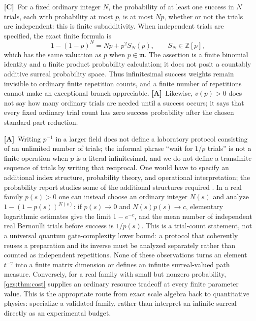 \documentclass[11pt,oneside]{article}
\numberwithin{equation}{section}
\theoremstyle{plain}
\theoremstyle{definition}
\theoremstyle{remark}
\newcommand{\Z}{\mathbb Z}
\newcommand{\mm}{\mathfrak m}
\newcommand{\TC}{\textcolor{TierC}{\textsf{\bfseries[C]}}}
\newcommand{\TA}{\textcolor{TierA}{\textsf{\bfseries[A]}}}
\begin{document}
\TC\ For a fixed ordinary integer $N$, the probability of at least one success in $N$ trials, each with probability at most $p$, is at most $Np$, whether or not the trials are independent: this is finite subadditivity. When independent trials are specified, the exact finite formula is
\[
 1-(1-p)^N=Np+p^2S_N(p),\qquad S_N\in\Z[p],
\]
which has the same valuation as $p$ when $p\in\mm$. The assertion is a finite binomial identity and a finite product probability calculation; it does not posit a countably additive surreal probability space. Thus infinitesimal success weights remain invisible to ordinary finite repetition counts, and a finite number of repetitions cannot make an exceptional branch appreciable. \TA\ Likewise, $v(p)>0$ does not say how many ordinary trials are needed until a success occurs; it says that every fixed ordinary trial count has zero success probability after the chosen standard-part reduction.

\TA\ Writing $p^{-1}$ in a larger field does not define a laboratory protocol consisting of an unlimited number of trials; the informal phrase ``wait for $1/p$ trials'' is not a finite operation when $p$ is a literal infinitesimal, and we do not define a transfinite sequence of trials by writing that reciprocal. One would have to specify an additional index structure, probability theory, and operational interpretation; the probability report studies some of the additional structures required \cite{repoProbability}. In a real family $p(s)>0$ one can instead choose an ordinary integer $N(s)$ and analyze $1-(1-p(s))^{N(s)}$: if $p(s)\to0$ and $N(s)p(s)\to c$, elementary logarithmic estimates give the limit $1-e^{-c}$, and the mean number of independent real Bernoulli trials before success is $1/p(s)$. This is a trial-count statement, not a universal quantum gate-complexity lower bound: a protocol that coherently reuses a preparation and its inverse must be analyzed separately rather than counted as independent repetitions. None of these observations turns an element $t^{-\gamma}$ into a finite matrix dimension or defines an infinite surreal-valued path measure. Conversely, for a real family with small but nonzero probability, \cref{qgs:thm:cost} supplies an ordinary resource tradeoff at every finite parameter value. This is the appropriate route from exact scale algebra back to quantitative physics: specialize a validated family, rather than interpret an infinite surreal directly as an experimental budget.
\end{document}
